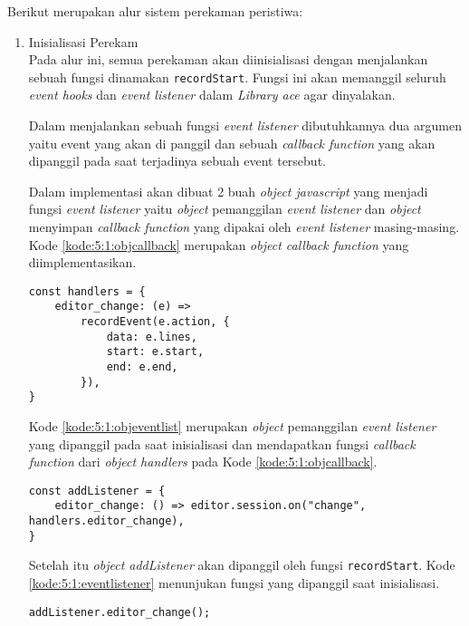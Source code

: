 Berikut merupakan alur sistem perekaman peristiwa:
\begin{enumerate}
    \item Inisialisasi Perekam \\
    Pada alur ini, semua perekaman akan diinisialisasi dengan menjalankan sebuah fungsi dinamakan \verb|recordStart|. Fungsi ini akan memanggil seluruh \textit{event hooks} dan \textit{event listener} dalam \textit{Library ace} agar dinyalakan. 
    
    Dalam menjalankan sebuah fungsi \textit{event listener} dibutuhkannya dua argumen yaitu event yang akan di panggil dan sebuah \textit{callback function} yang akan dipanggil pada saat terjadinya sebuah event tersebut. 
    
    Dalam implementasi akan dibuat 2 buah \textit{object javascript} yang menjadi fungsi \textit{event listener} yaitu \textit{object} pemanggilan \textit{event listener} dan \textit{object} menyimpan \textit{callback function} yang dipakai oleh \textit{event listener} masing-masing. Kode \ref{kode:5:1:objcallback} merupakan \textit{object callback function} yang diimplementasikan.
    \begin{lstlisting}[caption={\textit{object callback function}}, label={kode:5:1:objcallback}]
const handlers = {
    editor_change: (e) =>
        recordEvent(e.action, {
            data: e.lines,
            start: e.start,
            end: e.end,
        }),
}
    \end{lstlisting}
    
    Kode \ref{kode:5:1:objeventlist} merupakan \textit{object} pemanggilan \textit{event listener} yang dipanggil pada saat inisialisasi dan mendapatkan fungsi \textit{callback function} dari \textit{object handlers} pada Kode \ref{kode:5:1:objcallback}.
    \begin{lstlisting}[caption={\textit{object event listener}}, label={kode:5:1:objeventlist}]
const addListener = {
    editor_change: () => editor.session.on("change", handlers.editor_change),
}
    \end{lstlisting}

    Setelah itu \textit{object addListener} akan dipanggil oleh fungsi \verb|recordStart|. Kode \ref{kode:5:1:eventlistener} menunjukan fungsi yang dipanggil saat inisialisasi. 
    
    \begin{lstlisting}[caption={Beberapa \textit{event listener} yang dipanggil}, label={kode:5:1:eventlistener}]
addListener.editor_change();
    \end{lstlisting}
    

\end{enumerate}
